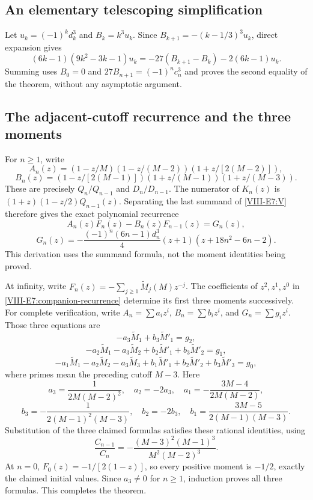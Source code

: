 \documentclass[11pt,letterpaper]{article}
\numberwithin{equation}{section}
\begin{document}
\subsection{An elementary telescoping simplification}
Let $u_k=(-1)^kd_k^3$ and $B_k=k^3u_k$. Since
$B_{k+1}=-(k-1/3)^3u_k$, direct expansion gives
\[
 (6k-1)(9k^2-3k-1)u_k
 =-27(B_{k+1}-B_k)-2(6k-1)u_k.
\]
Summing uses $B_0=0$ and $27B_{n+1}=(-1)^nc_n^3$ and proves the
second equality of the theorem, without any asymptotic argument.

\subsection{The adjacent-cutoff recurrence and the three moments}
For $n\ge1$, write
\[
 A_n(z)=(1-z/M)(1-z/(M-2))(1+z/[2(M-2)]),
\]
\[
 B_n(z)=(1-z/[2(M-1)])(1+z/(M-1))(1+z/(M-3)).
\]
These are precisely $Q_n/Q_{n-1}$ and $D_n/D_{n-1}$.
The numerator of $K_n(z)$ is
$(1+z)(1-z/2)Q_{n-1}(z)$. Separating the last summand of
\eqref{VIII-E7:V} therefore gives the exact polynomial recurrence
\begin{equation}\label{VIII-E7:companion-recurrence}
 A_n(z)F_n(z)-B_n(z)F_{n-1}(z)=G_n(z),
\end{equation}
\[
 G_n(z)=-\frac{(-1)^n(6n-1)d_n^3}{4}
 (z+1)(z+18n^2-6n-2).
\]
This derivation uses the summand formula, not the moment identities
being proved.

At infinity, write
$F_n(z)=-\sum_{j\ge1}\widetilde M_j(M)z^{-j}$.
The coefficients of $z^2,z^1,z^0$ in
\eqref{VIII-E7:companion-recurrence} determine its first three moments
successively. For complete verification, write $A_n=\sum a_i z^i$,
$B_n=\sum b_i z^i$, and $G_n=\sum g_i z^i$. Those three equations are
\[
 -a_3\widetilde M_1+b_3\widetilde M'_1=g_2,
\]
\[
 -a_2\widetilde M_1-a_3\widetilde M_2
 +b_2\widetilde M'_1+b_3\widetilde M'_2=g_1,
\]
\[
 -a_1\widetilde M_1-a_2\widetilde M_2-a_3\widetilde M_3
 +b_1\widetilde M'_1+b_2\widetilde M'_2+b_3\widetilde M'_3=g_0,
\]
where primes mean the preceding cutoff $M-3$. Here
\[
 a_3=\frac1{2M(M-2)^2},\quad a_2=-2a_3,\quad
 a_1=-\frac{3M-4}{2M(M-2)},
\]
\[
 b_3=-\frac1{2(M-1)^2(M-3)},\quad b_2=-2b_3,\quad
 b_1=\frac{3M-5}{2(M-1)(M-3)}.
\]
Substitution of the three claimed formulas satisfies these rational
identities, using
\[
 \frac{C_{n-1}}{C_n}
 =-\frac{(M-3)^2(M-1)^3}{M^2(M-2)^3}.
\]
At $n=0$, $F_0(z)=-1/[2(1-z)]$, so every positive moment is $-1/2$,
exactly the claimed initial values. Since $a_3\ne0$ for $n\ge1$,
induction proves all three formulas. This completes the theorem.
\end{document}
